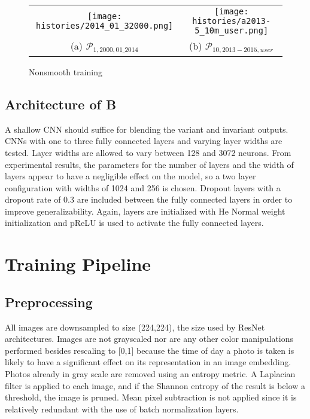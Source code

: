 \begin{figure}[!htbp]
	\centering
	\begin{tabular}{cc}
		\texttt{[image: histories/2014\_01\_32000.png]}  &       \texttt{[image: histories/a2013-5\_10m\_user.png]}  \\
		(a) $\mathcal{P}_{1,2000,01\_2014}$ & (b) $\mathcal{P}_{10,2013-2015,user}$\\[6pt]
	\end{tabular}
	\caption{Nonsmooth training}
	\label{fig:nonsmooth_training}
\end{figure}



\subsection{Architecture of B}
A shallow CNN should suffice for blending the variant and invariant outputs. CNNs with one to three fully connected layers and varying layer widths are tested. Layer widths are allowed to vary between 128 and 3072 neurons. From experimental results, the parameters for the number of layers and the width of layers appear to have a negligible effect on the model, so a two layer configuration with widths of 1024 and 256 is chosen. Dropout layers with a dropout rate of 0.3 are included between the fully connected layers in order to improve generalizability. Again, layers are initialized with He Normal weight initialization and pReLU is used to activate the fully connected layers.



\section{Training Pipeline}


\subsection{Preprocessing}
All images are downsampled to size (224,224), the size used by ResNet architectures.\cite{He2015} Images are not grayscaled nor are any other color manipulations performed besides rescaling to [0,1] because the time of day a photo is taken is likely to have a significant effect on its representation in an image embedding. Photos already in gray scale are removed using an entropy metric. A Laplacian filter is applied to each image, and if the Shannon entropy of the result is below a threshold, the image is pruned. Mean pixel subtraction is not applied since it is relatively redundant with the use of batch normalization layers. 

